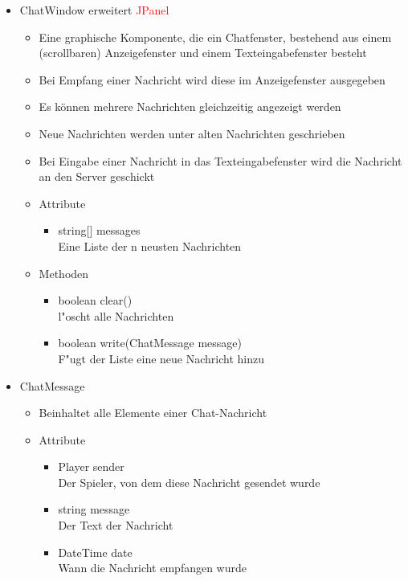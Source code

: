 \documentclass[a4paper,10pt]{article}
\begin{document}
\begin{itemize}
\item ChatWindow erweitert \textcolor{red}{JPanel}
\begin{itemize}
\item Eine graphische Komponente, die ein Chatfenster, bestehend aus einem (scrollbaren) Anzeigefenster und einem Texteingabefenster besteht
\item Bei Empfang einer Nachricht wird diese im Anzeigefenster ausgegeben
\item Es können mehrere Nachrichten gleichzeitig angezeigt werden
\item Neue Nachrichten werden unter alten Nachrichten geschrieben
\item Bei Eingabe einer Nachricht in das Texteingabefenster wird die Nachricht an den Server geschickt
\item Attribute
\begin{itemize}
\item string[] messages
\\Eine Liste der n neusten Nachrichten
\end{itemize}
\item Methoden
\begin{itemize}
\item boolean clear()
\\ l"oscht alle Nachrichten
\item boolean write(ChatMessage message)
\\F"ugt der Liste eine neue Nachricht hinzu
\end{itemize}
\end{itemize}

\item ChatMessage
\begin{itemize}
\item Beinhaltet alle Elemente einer Chat-Nachricht
\item Attribute
\begin{itemize}
\item Player sender
\\Der Spieler, von dem diese Nachricht gesendet wurde
\item string message
\\Der Text der Nachricht
\item DateTime date
\\Wann die Nachricht empfangen wurde
\end{itemize}
\end{itemize}


\end{itemize}
\end{document}
